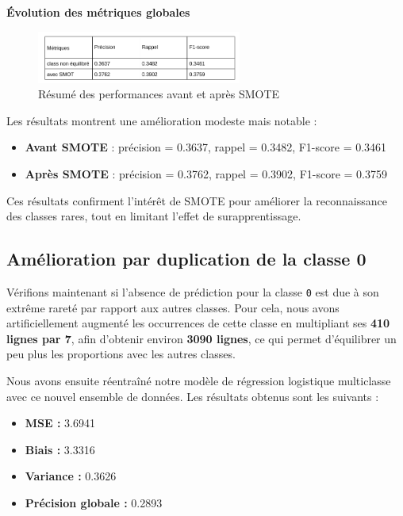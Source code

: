 \documentclass[a4paper,12pt]{article}
\begin{document}
\vspace{0.5em}
\noindent\textbf{Évolution des métriques globales}

\begin{figure}[H]
    \centering
    \includegraphics[width=0.6\textwidth]{resultats_smote_tableau.png}
    \caption{Résumé des performances avant et après SMOTE}
    \label{fig:smote_tableau}
\end{figure}

Les résultats montrent une amélioration modeste mais notable :
\begin{itemize}
    \item \textbf{Avant SMOTE} : précision = 0.3637, rappel = 0.3482, F1-score = 0.3461
    \item \textbf{Après SMOTE} : précision = 0.3762, rappel = 0.3902, F1-score = 0.3759
\end{itemize}

Ces résultats confirment l’intérêt de SMOTE pour améliorer la reconnaissance des classes rares, tout en limitant l’effet de surapprentissage.


\subsection{Amélioration par duplication de la classe 0}

Vérifions maintenant si l’absence de prédiction pour la classe \texttt{0} est due à son extrême rareté par rapport aux autres classes. Pour cela, nous avons artificiellement augmenté les occurrences de cette classe en multipliant ses \textbf{410 lignes par 7}, afin d’obtenir environ \textbf{3090 lignes}, ce qui permet d’équilibrer un peu plus les proportions avec les autres classes.

Nous avons ensuite réentraîné notre modèle de régression logistique multiclasse avec ce nouvel ensemble de données. Les résultats obtenus sont les suivants :
\begin{itemize}
    \item \textbf{MSE :} 3.6941
    \item \textbf{Biais :} 3.3316
    \item \textbf{Variance :} 0.3626
    \item \textbf{Précision globale :} 0.2893
\end{itemize}
\end{document}
